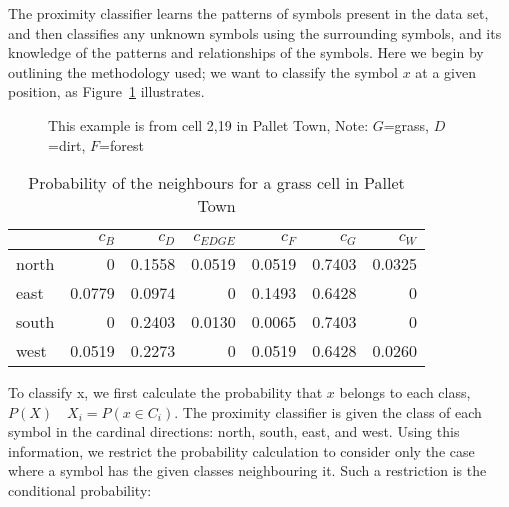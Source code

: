 
The proximity classifier learns the patterns of symbols present in the data set,
and then classifies any unknown symbols using the surrounding symbols, and its
knowledge of the patterns and relationships of the symbols. Here we begin by
outlining the methodology used; we want to classify the symbol $x$ at a given
position, as Figure~\ref{fig:neighbours} illustrates.

\begin{figure}[h]
\begin{center}
\end{center}
\caption{This example is from cell 2,19 in Pallet Town, Note: $G$=grass, $D$=dirt, $F$=forest}
\label{fig:neighbours}
\end{figure}


\begin{table}[h]
\label{table:relativefreq}
\begin{center}
\begin{tabular}{ l | r r r r r r }
              & $c_{B}$& $c_{D}$& $c_{EDGE}$& $c_{F}$& $c_{G}$& $c_{W}$ \\ 
              \hline
    north     & 0      & 0.1558 & 0.0519    & 0.0519 & 0.7403 & 0.0325\\
    east      & 0.0779 & 0.0974 & 0         & 0.1493 & 0.6428 & 0\\
    south     & 0      & 0.2403 & 0.0130    & 0.0065 & 0.7403 & 0\\
    west      & 0.0519 & 0.2273 & 0         & 0.0519 & 0.6428 & 0.0260\\
\end{tabular}
\caption{Probability of the neighbours for a grass cell in Pallet Town}
\end{center}
\end{table}

To classify x, we first calculate the probability that $x$ belongs to each
class, $P(X)\quad X_i = P(x\!\in\! C_i)$. The proximity classifier is given the
class of each symbol in the cardinal directions: north, south, east, and west.
Using this information, we restrict the probability calculation to consider
only the case where a symbol has the given classes neighbouring it. Such a
restriction is the conditional probability:

